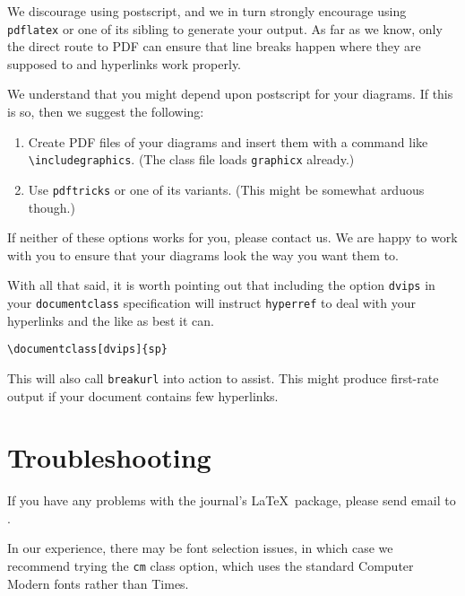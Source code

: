 \documentclass[lucida,final]{sp}
\newcommand{\spfile}[1]{\texttt{#1}}
\newcommand{\spcode}[1]{\texttt{#1}}
\newcommand{\cmd}[1]{\texttt{\textbackslash#1}}
\begin{document}
We discourage using postscript, and we in turn strongly encourage
using \spfile{pdflatex} or one of its sibling to generate your output.
As far as we know, only the direct route to PDF can ensure that line
breaks happen where they are supposed to and hyperlinks work properly.

We understand that you might depend upon postscript for your diagrams.
If this is so, then we suggest the following:
%
\begin{enumerate}
\item Create PDF files of your diagrams and insert them with a command
  like \cmd{includegraphics}. (The class file loads \spfile{graphicx}
  already.)
\item Use \spfile{pdftricks} or one of its variants.  (This might be
  somewhat arduous though.)
\end{enumerate}
%
If neither of these options works for you, please contact us.  We are
happy to work with you to ensure that your diagrams look the way you
want them to.

With all that said, it is worth pointing out that including the option
\spcode{dvips} in your \spcode{documentclass} specification will
instruct \spfile{hyperref} to deal with your hyperlinks and the like
as best it can.
%
\begin{Verbatim}
\documentclass[dvips]{sp}
\end{Verbatim}
%
This will also call \spfile{breakurl} into action to assist.  This
might produce first-rate output if your document contains few
hyperlinks.


\section{Troubleshooting}

If you have any problems with the journal's \LaTeX\ package, please
send email to .

In our experience, there may be font selection issues, in which case
we recommend trying the \spcode{cm} class option, which uses the 
standard Computer Modern fonts rather than Times.




\end{document}
